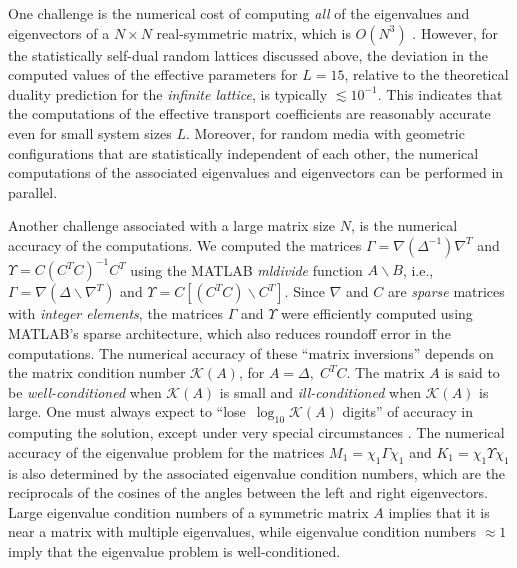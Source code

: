 \documentclass{cmslatex}
\begin{document}
One challenge is the numerical cost of computing \emph{all} of the
eigenvalues and eigenvectors of a $N\times N$ real-symmetric matrix, which
is $O(N^3)$ \cite{Demmel:1997}. However, for the statistically
self-dual random lattices discussed above, the deviation in the
computed 
values of the effective parameters for $L=15$, relative to the
theoretical duality prediction for the \emph{infinite lattice}, is
typically $\lesssim10^{-1}$. This indicates that the computations of the
effective transport coefficients are reasonably accurate even 
for small system sizes $L$. Moreover, for random media with geometric
configurations that are statistically independent of each other, the
numerical computations of the associated eigenvalues and eigenvectors
can be performed in parallel.






Another challenge associated with a large matrix size $N$, is the
numerical accuracy of the computations. We computed the matrices
$\Gamma=\nabla(\Delta^{-1})\nabla^T$ and $\Upsilon=C(C^TC)^{-1}C^T$ using the MATLAB
\emph{mldivide} function $A\backslash B$, i.e., $\Gamma=\nabla(\Delta\backslash \nabla^T)$ and
$\Upsilon=C[(C^TC)\backslash C^T]$. Since $\nabla$ and $C$ are \emph{sparse} matrices with
\emph{integer elements}, the matrices $\Gamma$ and $\Upsilon$ were efficiently
computed using MATLAB's sparse architecture, which also reduces roundoff
error in the computations. The numerical accuracy of these ``matrix
inversions'' depends on the matrix condition number $\mathcal{K}(A)$,
for $A=\Delta,\;C^TC$. The matrix $A$ is said to be
\emph{well-conditioned} when $\mathcal{K}(A)$ is small and
\emph{ill-conditioned} when $\mathcal{K}(A)$ is large. One must always
expect to ``lose $\,\log_{10}\mathcal{K}(A)$ digits'' of accuracy in
computing the solution, except under very special circumstances
\cite{Trefethen:1997:NLA}. The numerical accuracy of the eigenvalue
problem for the matrices $M_1=\chi_1\Gamma\chi_1$ and $K_1=\chi_1\Upsilon\chi_1$ is also determined
by the associated eigenvalue condition numbers, which are the
reciprocals of the cosines of the angles between the left and right
eigenvectors. Large eigenvalue condition numbers of a symmetric matrix
$A$ implies that it is near a matrix with multiple eigenvalues, while
eigenvalue condition numbers $\approx1$ imply that the eigenvalue problem
is well-conditioned. 
\end{document}
